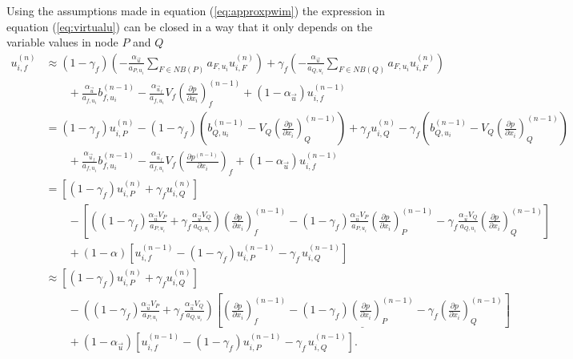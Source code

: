   Using the assumptions made in equation (\ref{eq:approxpwim}) the expression in equation (\ref{eq:virtualu}) can be closed in a way that it only depends on the variable values in node \(P\) and \(Q\)
  \begin{align}
    \label{eq:closepwim}
    u_{i,f}^{(n)} 
    &\approx 
    \left(1-\gamma_f\right)  \left( -\frac{\alpha_\vec{u}}{a_{P,u_i}} \sum_{F \in NB(P)} a_{F,u_i} u_{i,F}^{(n)} \right)
    +\gamma_f  \left( -\frac{\alpha_\vec{u}}{a_{Q,u_i}} \sum_{F \in NB(Q)} a_{F,u_i} u_{i,F}^{(n)}  \right) \nonumber \\[1em]
    &\quad\quad+ \frac{\alpha_\vec{u}}{a_{f,u_i}}b_{f,u_i}^{(n-1)} 
    - \frac{\alpha_{\vec{u}_f}}{a_{f,u_i}}V_f\left(\frac{\partial p}{\partial x_i}\right)_f^{(n-1)} 
    + \left(1 - \alpha_{\vec{u}}\right) u_{i,f}^{(n-1)} \nonumber \\[1em]
    &=
    \left(1-\gamma_f\right) u_{i,P}^{(n)} - \left(1 - \gamma_f\right) \left(  b_{Q,u_i}^{(n-1)} - V_Q \left(\frac{\partial p}{\partial x_i}\right)_Q^{(n-1)} \right) \nonumber
    +\gamma_f  u_{i,Q}^{(n)} - \gamma_f\left( b_{Q,u_i}^{(n-1)} - V_Q \left(\frac{\partial p}{\partial x_i}\right)_Q^{(n-1)}  \right) \nonumber \\[1em]
    &\quad\quad+ \frac{\alpha_{\vec{u}_f}}{a_{f,u_i}}b_{f,u_i}^{(n-1)} 
    - \frac{\alpha_{\vec{u}_f}}{a_{f,u_i}}V_f\left(\frac{\partial p^{(n-1)}}{\partial x_i}\right)_f 
    + \left(1 - \alpha_{\vec{u}}\right) u_{i,f}^{(n-1)} \nonumber\\[1em]
    &=
    \left[\left(1 - \gamma_f\right) u_{i,P}^{(n)} + \gamma_f u_{i,Q}^{(n)} \right] \nonumber\\[1em]
    &\quad\quad - 
    \left[ 
    \left(\left(1 - \gamma_f\right) \frac{\alpha_\vec{u} V_P}{a_{P,u_i}} + \gamma_f \frac{\alpha_\vec{u} V_Q}{a_{Q,u_i}}\right)
    \left(\frac{\partial p}{\partial x_i}\right)_f^{(n-1)} 
    - \left(1 - \gamma_f \right) \frac{\alpha_\vec{u} V_P}{a_{P,u_i}}\left( \frac{\partial p}{\partial x_i} \right)_P^{(n-1)} 
    - \gamma_f \frac{\alpha_\vec{u} V_Q}{a_{Q,u_i}}\left(\frac{\partial p}{\partial x_i}\right)_Q^{(n-1)}
    \right] \nonumber \\[1em]
    &\quad\quad + \left(1 - \alpha\right) \left[ u_{i,f}^{(n-1)} - \left(1 - \gamma_f\right) u_{i,P}^{(n-1)} - \gamma_f \, u_{i,Q}^{(n-1)} \right] \nonumber \\[1em]
    &\approx
    \left[\left(1 - \gamma_f\right) u_{i,P}^{(n)} + \gamma_f u_{i,Q}^{(n)} \right] \nonumber\\[1em]
    &\quad\quad - 
    \left(\left(1 - \gamma_f\right) \frac{\alpha_\vec{u} V_P}{a_{P,u_i}} + \gamma_f \frac{\alpha_\vec{u} V_Q}{a_{Q,u_i}}\right)
    \left[ 
      \underline{\left(\frac{\partial p}{\partial x_i}\right)_f^{(n-1)} 
    - \left(1 - \gamma_f \right) \left( \frac{\partial p}{\partial x_i} \right)_P^{(n-1)} 
  - \gamma_f \left(\frac{\partial p}{\partial x_i}\right)_Q^{(n-1)}}
    \right] \nonumber \\[1em]
    &\quad\quad + \left(1 - \alpha_\vec{u}\right) \left[ u_{i,f}^{(n-1)} - \left(1 - \gamma_f\right) u_{i,P}^{(n-1)} - \gamma_f \, u_{i,Q}^{(n-1)} \right].
  \end{align}

